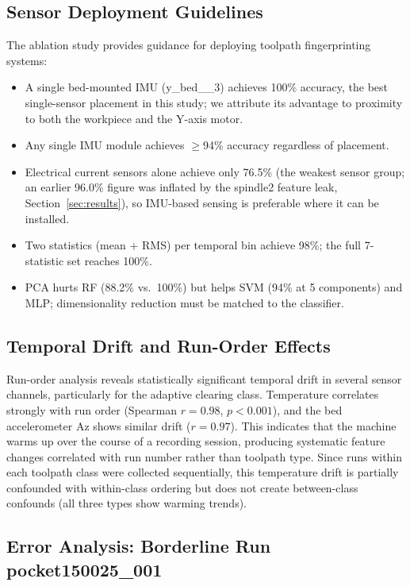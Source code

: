\subsection{Sensor Deployment Guidelines}

The ablation study provides guidance for deploying toolpath fingerprinting systems:
\begin{itemize}
    \item A single bed-mounted IMU (y\_bed\_\_3) achieves 100\% accuracy, the best single-sensor placement in this study; we attribute its advantage to proximity to both the workpiece and the Y-axis motor.
    \item Any single IMU module achieves $\geq$94\% accuracy regardless of placement.
    \item Electrical current sensors alone achieve only 76.5\% (the weakest sensor group; an earlier 96.0\% figure was inflated by the spindle2 feature leak, Section~\ref{sec:results}), so IMU-based sensing is preferable where it can be installed.
    \item Two statistics (mean + RMS) per temporal bin achieve 98\%; the full 7-statistic set reaches 100\%.
    \item PCA hurts RF (88.2\% vs.\ 100\%) but helps SVM (94\% at 5 components) and MLP; dimensionality reduction must be matched to the classifier.
\end{itemize}

\subsection{Temporal Drift and Run-Order Effects}

Run-order analysis reveals statistically significant temporal drift in several sensor channels, particularly for the adaptive clearing class. Temperature correlates strongly with run order (Spearman $r = 0.98$, $p < 0.001$), and the bed accelerometer Az shows similar drift ($r = 0.97$). This indicates that the machine warms up over the course of a recording session, producing systematic feature changes correlated with run number rather than toolpath type. Since runs within each toolpath class were collected sequentially, this temperature drift is partially confounded with within-class ordering but does not create between-class confounds (all three types show warming trends).

\subsection{Error Analysis: Borderline Run pocket150025\_001}

